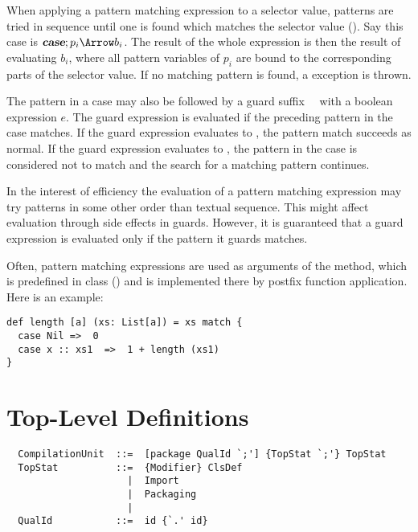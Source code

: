 \documentclass[a4paper,12pt,twoside,titlepage]{book}
\begin{document}
When applying a pattern matching expression to a selector value,
patterns are tried in sequence until one is found which matches the
selector value (). Say this case is $\CASE;p_i
\Arrow b_i$.  The result of the whole expression is then the result of
evaluating $b_i$, where all pattern variables of $p_i$ are bound to
the corresponding parts of the selector value.  If no matching pattern
is found, a  exception is thrown.

The pattern in a case may also be followed by a guard suffix \ \ 
with a boolean expression $e$.  The guard expression is evaluated if
the preceding pattern in the case matches. If the guard expression
evaluates to \code{true}, the pattern match succeeds as normal. If the
guard expression evaluates to \code{false}, the pattern in the case
is considered not to match and the search for a matching pattern
continues.


In the interest of efficiency the evaluation of a pattern matching
expression may try patterns in some other order than textual
sequence. This might affect evaluation through
side effects in guards. However, it is guaranteed that a guard
expression is evaluated only if the pattern it guards matches.

\example
Often, pattern matching expressions are used as arguments
of the  method, which is predefined in class 
(\sref{sec:cls-object}) and is implemented there by postfix function
application. Here is an example:
\begin{lstlisting}
def length [a] (xs: List[a]) = xs match {
  case Nil =>  0
  case x :: xs1  =>  1 + length (xs1)
}
\end{lstlisting}

\chapter{Top-Level Definitions}
\label{sec:topdefs}

\syntax\begin{lstlisting}
  CompilationUnit  ::=  [package QualId `;'] {TopStat `;'} TopStat
  TopStat          ::=  {Modifier} ClsDef
                     |  Import
                     |  Packaging
                     |
  QualId           ::=  id {`.' id}
\end{lstlisting}
\end{document}
